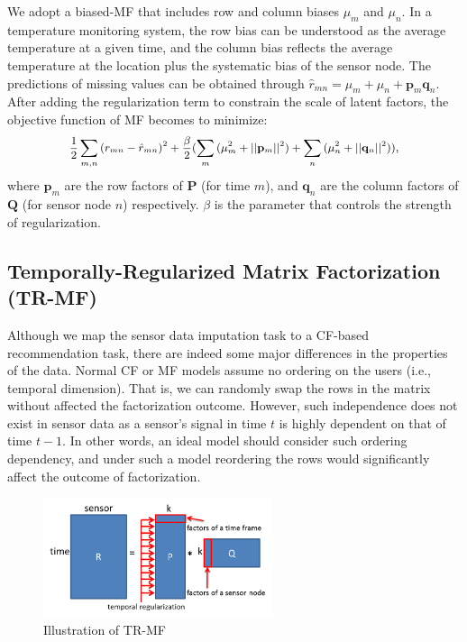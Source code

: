 We adopt a biased-MF that includes row and column biases $\mu_m$ and $\mu_n$. 
In a temperature monitoring system, the row bias can be understood as the average temperature at a given time, and the column bias reflects the average temperature at the location plus the systematic bias of the sensor node.
The predictions of missing values can be obtained through $\hat{r}_{mn} = \mu_m + \mu_n + \mathbf{p}_m \mathbf{q}_n$.
After adding the regularization term to constrain the scale of latent factors, the objective function of MF becomes to minimize:
\begin{equation*}\small \begin{aligned}
\frac{1}{2}\sum_{m,n}{(r_{mn} - \hat{r}_{mn})}^2
+ \frac{\beta}{2}(\sum_m{(\mu_m^2 + ||\mathbf{p}_m||^2)} + \sum_n{(\mu_n^2 + ||\mathbf{q}_n||^2)}),
\end{aligned}\end{equation*}
where $\mathbf{p}_m$ are the row factors of $\mathbf{P}$ (for time $m$), and $\mathbf{q}_n$ are the column factors of $\mathbf{Q}$ (for sensor node $n$) respectively.
$\beta$ is the parameter that controls the strength of regularization.

\subsection{Temporally-Regularized Matrix Factorization (TR-MF)}

Although we map the sensor data imputation task to a CF-based recommendation task, there are indeed some major differences in the properties of the data.
Normal CF or MF models assume no ordering on the users (i.e., temporal dimension). That is, we can randomly swap the rows in the matrix without affected the factorization outcome. However, such independence does not exist in sensor data as a 
sensor's signal in time $t$ is highly dependent on that of time $t-1$. In other words, an ideal model should consider such ordering dependency, and under such a model reordering the
rows would significantly affect the outcome of factorization.

\begin{figure}[htbp]
	\centering
	\includegraphics[width=0.6\textwidth, trim=4 4 4 4, clip]{TRMF_illustration_white.png}
	\vspace{-0.1in}
	\caption{\label{fig:tr-mf} Illustration of TR-MF}
\end{figure}


